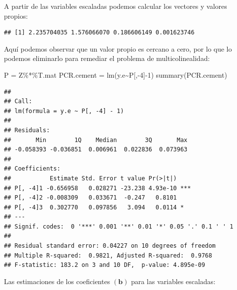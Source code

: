 \documentclass[
]{article}
\newenvironment{Shaded}{\begin{snugshade}}{\end{snugshade}}
\newcommand{\DecValTok}[1]{\textcolor[rgb]{0.00,0.00,0.81}{#1}}
\newcommand{\FunctionTok}[1]{\textcolor[rgb]{0.00,0.00,0.00}{#1}}
\newcommand{\NormalTok}[1]{#1}
\newcommand{\OtherTok}[1]{\textcolor[rgb]{0.56,0.35,0.01}{#1}}
\newcommand{\SpecialCharTok}[1]{\textcolor[rgb]{0.00,0.00,0.00}{#1}}
\begin{document}
A partir de las variables escaladas podemos calcular los vectores y valores propios:

\begin{Shaded}
\end{Shaded}

\begin{verbatim}
## [1] 2.235704035 1.576066070 0.186606149 0.001623746
\end{verbatim}

Aquí podemos observar que un valor propio es cercano a cero, por lo que lo podemos eliminarlo para remediar el problema de multicolinealidad:

\begin{Shaded}
\begin{Highlighting}[]
\NormalTok{P }\OtherTok{=}\NormalTok{ Z}\SpecialCharTok{\%*\%}\NormalTok{T.mat}
\NormalTok{PCR.cement }\OtherTok{=} \FunctionTok{lm}\NormalTok{(y.e}\SpecialCharTok{\textasciitilde{}}\NormalTok{P[,}\SpecialCharTok{{-}}\DecValTok{4}\NormalTok{]}\SpecialCharTok{{-}}\DecValTok{1}\NormalTok{)}
\FunctionTok{summary}\NormalTok{(PCR.cement)}
\end{Highlighting}
\end{Shaded}

\begin{verbatim}
## 
## Call:
## lm(formula = y.e ~ P[, -4] - 1)
## 
## Residuals:
##       Min        1Q    Median        3Q       Max 
## -0.058393 -0.036851  0.006961  0.022836  0.073963 
## 
## Coefficients:
##           Estimate Std. Error t value Pr(>|t|)    
## P[, -4]1 -0.656958   0.028271 -23.238 4.93e-10 ***
## P[, -4]2 -0.008309   0.033671  -0.247   0.8101    
## P[, -4]3  0.302770   0.097856   3.094   0.0114 *  
## ---
## Signif. codes:  0 '***' 0.001 '**' 0.01 '*' 0.05 '.' 0.1 ' ' 1
## 
## Residual standard error: 0.04227 on 10 degrees of freedom
## Multiple R-squared:  0.9821, Adjusted R-squared:  0.9768 
## F-statistic: 183.2 on 3 and 10 DF,  p-value: 4.895e-09
\end{verbatim}

Las estimaciones de los coeficientes \((\boldsymbol b)\) para las variables escaladas:
\end{document}
